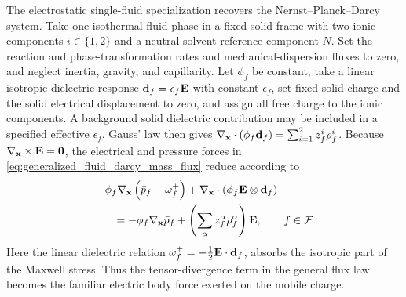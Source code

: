 The electrostatic single-fluid specialization recovers the
Nernst--Planck--Darcy system.  Take one isothermal fluid phase in a fixed solid
frame with two ionic components \(i\in\{1,2\}\) and a neutral solvent reference
component \(N\).  Set the reaction and phase-transformation rates and
mechanical-dispersion fluxes to zero, and neglect inertia, gravity, and
capillarity.  Let \(\phi_f\) be constant, take a linear isotropic dielectric
response \(\mathbf{d}_f=\epsilon_f\mathbf{E}\) with constant \(\epsilon_f\), set fixed
solid charge and the solid electrical displacement to zero, and assign all free
charge to the ionic components.  A background solid dielectric contribution
may be included in a specified effective \(\epsilon_f\).  Gauss' law then gives
\(\nabla_{\mathbf{x}}\cdot(\phi_f\mathbf{d}_f)
=\sum_{i=1}^2 z_f^i\rho_f^i\).  Because
\(\nabla_{\mathbf{x}}\times\mathbf{E}=\mathbf{0}\), the electrical and pressure forces in
\eqref{eq:generalized_fluid_darcy_mass_flux} reduce according to
%
\begin{align}
	&-\phi_f\nabla_{\mathbf{x}}
	\left(
		\bar p_f-\omega_f^+
	\right)
	+\nabla_{\mathbf{x}}\cdot
	\left(
		\phi_f\mathbf{E}\otimes\mathbf{d}_f
	\right)
	\notag \\
	&\qquad =
	-\phi_f\nabla_{\mathbf{x}}\bar p_f
	+
	\left(
		\sum_\alpha z_f^\alpha\rho_f^\alpha
	\right)\mathbf{E},
	\qquad
	f\in\mathcal{F} .
	\label{eq:nernst_planck_darcy_maxwell_force_reduction}
\end{align}
%
Here the linear dielectric relation
\(\omega_f^+=-\frac{1}{2}\mathbf{E}\cdot\mathbf{d}_f\), absorbs the isotropic part of
the Maxwell stress.  Thus the tensor-divergence term in the general flux law
becomes the familiar electric body force exerted on the mobile charge.

